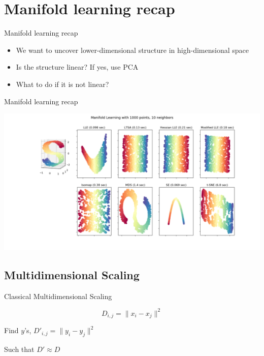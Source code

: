 \documentclass[unknownkeysallowed]{beamer}
\begin{document}
\section{Manifold learning recap}
\begin{frame}{Manifold learning recap}

	\begin{itemize}
	\item We want to uncover lower-dimensional structure in high-dimensional space
	\item Is the structure linear? If yes, use PCA
	\item What to do if it is not linear?
	\end{itemize}
\end{frame}
\begin{frame}{Manifold learning recap}



	\includegraphics[width=\textwidth,height=0.8\textheight,keepaspectratio]{manifold_algorithms}

\end{frame}

\subsection{Multidimensional Scaling}
\begin{frame}{Classical Multidimensional Scaling}


	$$D_{i,j} = \|x_i - x_j\|^2$$

	Find $y$'s, $D'_{i,j} = \|y_i - y_j\|^2$ 

	Such that $D' \approx D$

\end{frame}
\end{document}
